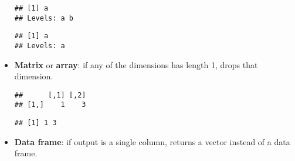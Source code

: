 \begin{itemize}
\begin{Shaded}
\begin{Highlighting}[]
\StringTok{ }\NormalTok{(}\NormalTok{(}\NormalTok{, }\NormalTok{))}
\NormalTok{z[}\NormalTok{]}
\end{Highlighting}
\end{Shaded}

\begin{verbatim}
## [1] a
## Levels: a b
\end{verbatim}

\begin{Shaded}
\begin{Highlighting}[]
\NormalTok{z[}\StringTok{ }\NormalTok{]}
\end{Highlighting}
\end{Shaded}

\begin{verbatim}
## [1] a
## Levels: a
\end{verbatim}
\item
  \textbf{Matrix} or \textbf{array}: if any of the dimensions has length
  1, drops that dimension.

\begin{Shaded}
\begin{Highlighting}[]
\StringTok{ }\NormalTok{(}\OperatorTok{:}\NormalTok{, } \NormalTok{)}
\NormalTok{a[}\StringTok{ }\NormalTok{]}
\end{Highlighting}
\end{Shaded}

\begin{verbatim}
##      [,1] [,2]
## [1,]    1    3
\end{verbatim}

\begin{Shaded}
\begin{Highlighting}[]
\NormalTok{a[}\NormalTok{, ]}
\end{Highlighting}
\end{Shaded}

\begin{verbatim}
## [1] 1 3
\end{verbatim}
\item
  \textbf{Data frame}: if output is a single column, returns a vector
  instead of a data frame.


\end{itemize}
